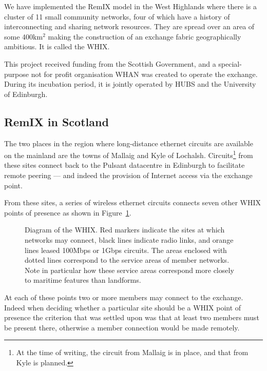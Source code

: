 
We have implemented the RemIX model in the West Highlands where there
is a cluster of
11 small community networks, four of which have a history of
interconnecting and sharing network resources. They are spread over an
area of some 400km$^2$  making the
construction of an exchange fabric geographically ambitious. It is
called the \acf{WHIX}.

This project received funding from the Scottish Government, and a
special-purpose not for profit organisation \ac{WHAN} was created to
operate the exchange. During its incubation period, it is jointly
operated by HUBS and the University of Edinburgh.

\subsection{RemIX in Scotland}

The two places in the region where long-distance ethernet circuits are
available on the mainland are the towns of Mallaig and Kyle of
Lochalsh. Circuits\footnote{At the time of writing, the circuit from
Mallaig is in place, and that from Kyle is planned.} from these sites
connect back to the Pulsant datacentre in Edinburgh to facilitate
remote peering --- and indeed the provision of Internet access via the
exchange point.

From these sites, a series of wireless ethernet circuits connects
seven other \ac{WHIX} points of presence as shown in
Figure~\ref{fig:whixmap}. 
\begin{figure}[h]
  \resizebox{\linewidth}{!}{
    \begin{tikzpicture}
      \whixphysicaldiagram
    \end{tikzpicture}
  }
  \caption{
  Diagram of the \acf{WHIX}. Red markers indicate
  the sites at which networks may connect, black lines indicate radio
  links, and orange lines leased 100Mbps or 1Gbps circuits. The areas
  enclosed with dotted lines correspond to the service areas of member
  networks. Note in particular how these service areas correspond more 
  closely to maritime features than landforms.
  }
  \label{fig:whixmap}
\end{figure}
At each of these points two or more members may connect to the
exchange. Indeed when deciding whether a particular site should be
a \ac{WHIX} point of presence the criterion that was settled upon was
that at least two members must be present there, otherwise a member
connection would be made remotely.

